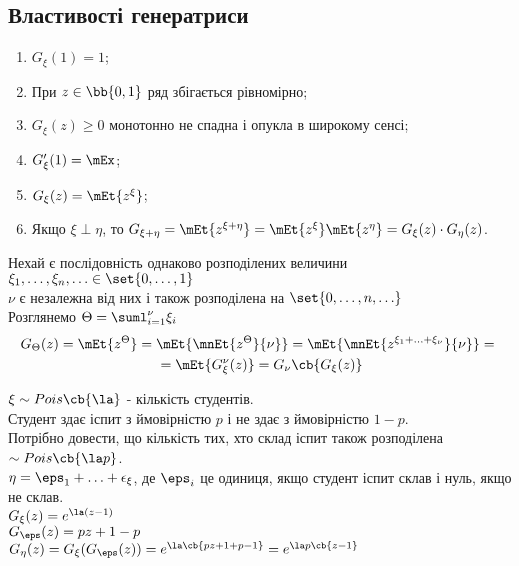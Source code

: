 \subsection{Властивості генератриси}
\begin{enumerate}
\item $G_\xi(1)=1$;
\item При $z\in\bb{0,1}$ ряд збігається рівномірно;
\item $G_\xi(z)\geq 0$ монотонно не спадна і опукла в широкому сенсі;
\item $G_\xi'(1)= \mEx$;
\item $G_\xi(z)=\mEt{z^\xi}$;
\item Якщо $\xi\perp\eta$, то $G_{\xi+\eta}=\mEt{z^{\xi+\eta}} = \mEt{z^\xi}\mEt{z^{\eta}} = G_\xi(z)\cdot G_\eta(z)$.
\end{enumerate}
Нехай є послідовність однаково розподілених величини $\xi_1,\ldots,\xi_n,\ldots\in\set{0,\ldots,1}$\\
$\nu$ є незалежна від них і також розподілена на $\set{0,\ldots,n,\ldots}$\\
Розглянемо $\Theta = \suml_{i=1}^\nu\xi_i$\\
\begin{multline}
G_{\Theta}(z) = \mEt{z^\Theta} = \mEt{\mnEt{z^\Theta}{\nu}} = \mEt{\mnEt{z^{\xi_1+\ldots+\xi_\nu}}{\nu}} ={}\\{}= \mEt{G^\nu_\xi(z)} = G_\nu\cb{G_\xi(z)}
\end{multline}
\begin{exs}
$\xi\sim Pois\cb{\la}$ - кількість студентів. \\
Студент здає іспит з ймовірністю $p$ і не здає з ймовірністю $1-p$.\\
Потрібно довести, що кількість тих, хто склад іспит також розподілена $\sim Pois\cb{\la p}$. \\
$\eta = \eps_1+\ldots+\epsilon_\xi$, де $\eps_i$ це одиниця, якщо студент іспит склав і нуль, якщо не склав.\\
$G_\xi(z) = e^{\la(z-1)}$\\
$G_\eps(z) = pz+1-p$\\
$G_\eta(z) = G_\xi(G_\eps(z)) = e^{\la\cb{pz+1+p-1}} = e^{\la p\cb{z-1}}$
\end{exs}
